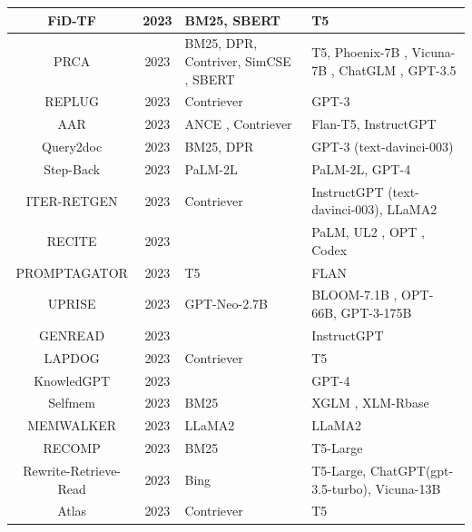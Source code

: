 \begin{table}
{\begin{tabular}{|c|c|m{5cm}|m{6cm}|}
			\hline
			FiD-TF \cite{berchansky2023optimizing} & 2023 & BM25, SBERT \cite{reimers2019sentencebert} & T5 \\ 
			\hline
			PRCA \cite{yang2023prca} & 2023 & BM25, DPR, Contriver, SimCSE \cite{gao2021simcse}, SBERT & T5, Phoenix-7B \cite{chen2023phoenix}, Vicuna-7B \cite{vicuna2023}, ChatGLM \cite{du2022glm}, GPT-3.5 \\ 
			\hline
			REPLUG \cite{shi2023replug} & 2023 & Contriever & GPT-3 \\ 
			\hline
			AAR \cite{yu2023augmentationadapted} & 2023 & ANCE \cite{xiong2021approximate}, Contriever & Flan-T5, InstructGPT \\ 
			\hline
			Query2doc \cite{wang2023querydoc} & 2023 & BM25, DPR & GPT-3 (text-davinci-003) \\ 
			\hline
			Step-Back \cite{zheng2024take} & 2023 & PaLM-2L \cite{chowdhery2023palm} & PaLM-2L, GPT-4 \\ 
			\hline
			ITER-RETGEN \cite{shao2023enhancing} & 2023 & Contriever & InstructGPT (text-davinci-003), LLaMA2 \\ 
			\hline
			RECITE \cite{sun2023recitationaugmented} & 2023 & & PaLM, UL2 \cite{tay2023ul}, OPT \cite{zhang2022opt}, Codex \cite{chen2021evaluating} \\ 
			\hline
			PROMPTAGATOR \cite{dai2023promptagator} & 2023 & T5 & FLAN \\ 
			\hline
			UPRISE \cite{cheng2023uprise} & 2023 & GPT-Neo-2.7B \cite{black2022gptneoxb} & BLOOM-7.1B \cite{workshop2022bloom}, OPT-66B, GPT-3-175B \\ 
			\hline
			GENREAD \cite{yu2023generate} & 2023 &  & InstructGPT \\ 
			\hline
			LAPDOG \cite{huang2023learning} & 2023 & Contriever & T5 \\
			\hline
			KnowledGPT \cite{wang2023knowledgpt} & 2023 &  & GPT-4 \\ 
			\hline
			Selfmem \cite{cheng2023lift} & 2023 & BM25 & XGLM \cite{lin2022fewshot}, XLM-Rbase \cite{conneau2020unsupervised} \\ 
			\hline
			MEMWALKER \cite{chen2023walking} & 2023 & LLaMA2 & LLaMA2 \\ 
			\hline
			RECOMP \cite{xu2024recomp} & 2023 & BM25 & T5-Large \\ 
			\hline
			Rewrite-Retrieve-Read \cite{ma2023query} & 2023 & Bing & T5-Large, ChatGPT(gpt-3.5-turbo), Vicuna-13B \\ 
			\hline
			Atlas \cite{ma2023query} & 2023 & Contriever & T5 \\ 

\end{tabular}}
\end{table}
